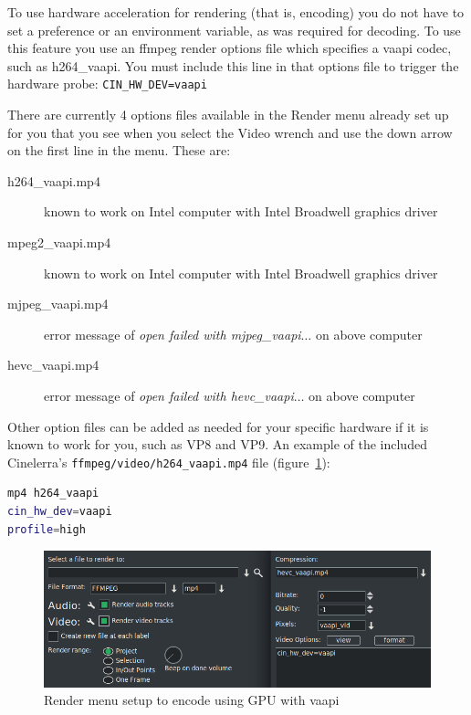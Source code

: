 To use hardware acceleration for rendering (that is, encoding) you do not have to set a preference or an environment variable, as was required for decoding.  To use this feature you use an ffmpeg render options file which specifies a vaapi codec, such as h264\_vaapi.  You must include this line in that options file to trigger the hardware probe: \qquad	\texttt{CIN\_HW\_DEV=vaapi}

There are currently 4 options files available in the Render menu already set up for you that you see when you select the Video wrench and use the down arrow on the first line in the menu.  These are:

\begin{description}
	\item[h264\_vaapi.mp4] known to work on Intel computer with Intel Broadwell graphics driver
	\item[mpeg2\_vaapi.mp4] known to work on Intel computer with Intel Broadwell graphics driver
	\item[mjpeg\_vaapi.mp4] error message of \textit{open failed with mjpeg\_vaapi$\dots$} on above computer
	\item[hevc\_vaapi.mp4] error message of \textit{open failed with hevc\_vaapi$\dots$} on above computer
\end{description}

Other option files can be added as needed for your specific hardware if it is known to work for you, such as VP8 and VP9.  An example of the included Cinelerra’s \texttt{ffmpeg/video/h264\_vaapi.mp4} file (figure~\ref{fig:render-vaapi}):

\begin{lstlisting}[language=bash,numbers=none]
mp4 h264_vaapi
cin_hw_dev=vaapi
profile=high
\end{lstlisting}

\begin{figure}[htpb]
	\centering
	\includegraphics[width=0.8\linewidth]{images/render-vaapi.png}
	\caption{Render menu setup to encode using GPU with vaapi}
	\label{fig:render-vaapi}
\end{figure}

